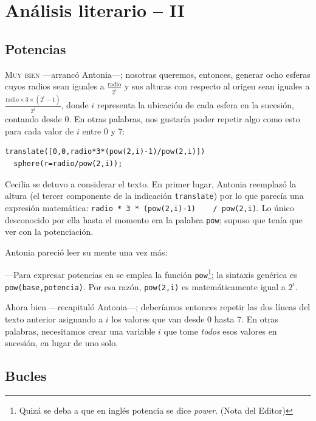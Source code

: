 \chapter{Análisis literario -- II}
\label{sec:analisis-literario-ii}

\section{Potencias}

\lettrine[ante=\raisebox{-1.5ex}{\Large ---},lines=2]{M}{uy bien}
---arrancó Antonia---; nosotras queremos, entonces, generar ocho
esferas cuyos radios sean iguales a $\frac{\text{radio}}{2^i}$ y sus
alturas con respecto al origen sean iguales a
$\frac{\text{radio}\times 3\times (2^i-1)}{2^i}$, donde $i$ representa
la ubicación de cada esfera en la sucesión, contando desde 0. En otras
palabras, nos gustaría poder repetir algo como esto para cada valor de
$i$ entre 0 y 7:


    \begin{lstlisting}
translate([0,0,radio*3*(pow(2,i)-1)/pow(2,i)])
  sphere(r=radio/pow(2,i));
    \end{lstlisting}

    Cecilia se detuvo a considerar el texto. En primer lugar, Antonia
    reemplazó la altura (el tercer componente de la indicación
    \lstinline!translate!) por lo que parecía una expresión
    matemática: \lstinline!radio * 3 * (pow(2,i)-1)    / pow(2,i)!. Lo
    único desconocido por ella hasta el momento era la palabra
    \lstinline!pow!; supuso que tenía que ver con la potenciación.

 Antonia pareció leer su mente una vez más:
 
 ---Para expresar potencias en \openscad{} se emplea la función
 \lstinline!pow!\footnote{Quizá se deba a que en inglés potencia se
   dice \emph{power}. (Nota del Editor)}; la sintaxis genérica es
 \lstinline!pow(base,potencia)!. Por esa razón, \lstinline!pow(2,i)!
 es matemáticamente igual a $2^i$.

 \guillemotright Ahora bien ---recapituló Antonia---; deberíamos
 entonces repetir las dos líneas del texto anterior asignando a $i$
 los valores que van desde 0 hasta 7. En otras palabras, necesitamos
 crear una variable $i$ que tome \emph{todos} esos valores en
 sucesión, en lugar de uno solo.
 
 \section{Bucles}

